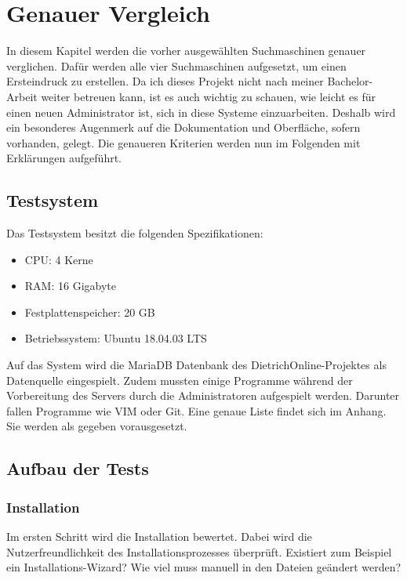 \chapter{Genauer Vergleich}

In diesem Kapitel werden die vorher ausgewählten Suchmaschinen genauer verglichen. Dafür werden alle vier Suchmaschinen aufgesetzt, um einen Ersteindruck zu erstellen. Da ich dieses Projekt nicht nach meiner Bachelor-Arbeit weiter betreuen kann, ist es auch wichtig zu schauen, wie leicht  es für einen neuen Administrator ist, sich in diese Systeme einzuarbeiten. Deshalb wird ein besonderes Augenmerk auf die Dokumentation und Oberfläche, sofern vorhanden, gelegt. Die genaueren Kriterien werden nun im Folgenden mit Erklärungen aufgeführt.

\section{Testsystem}
Das Testsystem besitzt die folgenden Spezifikationen:

\begin{itemize}
    \item CPU: 4 Kerne
    \item RAM: 16 Gigabyte
    \item Festplattenspeicher: 20 GB
    \item Betriebssystem: Ubuntu 18.04.03 LTS
\end{itemize} 

Auf das System wird die MariaDB Datenbank des DietrichOnline-Projektes als Datenquelle eingespielt. Zudem mussten einige Programme während der Vorbereitung des Servers durch die Administratoren aufgespielt werden. Darunter fallen Programme wie VIM oder Git. Eine genaue Liste findet sich im Anhang. Sie werden als gegeben vorausgesetzt.

\section{Aufbau der Tests}

\subsection{Installation}

Im ersten Schritt wird die Installation bewertet. Dabei wird die Nutzerfreundlichkeit des Installationsprozesses überprüft. Existiert zum Beispiel ein Installations-Wizard? Wie viel muss manuell in den Dateien geändert werden?


